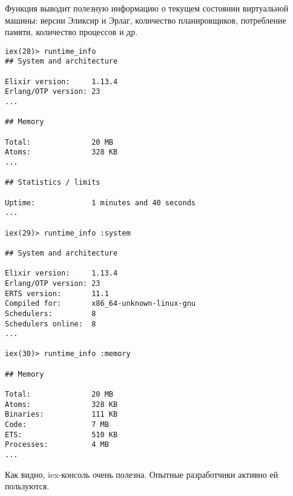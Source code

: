 Функция выводит полезную информацию о текущем состоянии виртуальной машины: версии Эликсир и Эрлаг, количество планировщиков, потребление памяти, количество процессов и др.

\begin{lstlisting}
iex(28)> runtime_info
## System and architecture

Elixir version:     1.13.4
Erlang/OTP version: 23
...

## Memory

Total:              20 MB
Atoms:              328 KB
...

## Statistics / limits

Uptime:             1 minutes and 40 seconds
...

iex(29)> runtime_info :system

## System and architecture

Elixir version:     1.13.4
Erlang/OTP version: 23
ERTS version:       11.1
Compiled for:       x86_64-unknown-linux-gnu
Schedulers:         8
Schedulers online:  8
...

iex(30)> runtime_info :memory

## Memory

Total:              20 MB
Atoms:              328 KB
Binaries:           111 KB
Code:               7 MB
ETS:                510 KB
Processes:          4 MB
...
\end{lstlisting}

Как видно, iex-консоль очень полезна. Опытные разработчики активно ей пользуются.
